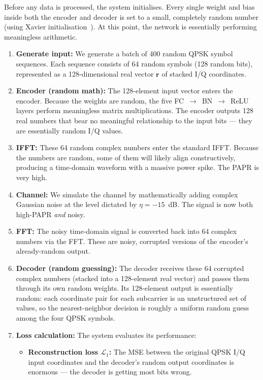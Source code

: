 Before any data is processed, the system initialises.  Every single weight and bias inside both the encoder and decoder is set to a small, completely random number (using Xavier initialisation~\cite{kim2017novel}).  At this point, the network is essentially performing meaningless arithmetic.

\begin{enumerate}
    \item \textbf{Generate input:} We generate a batch of 400 random QPSK symbol sequences. Each sequence consists of 64 random symbols (128 random bits), represented as a 128-dimensional real vector $\bm{r}$ of stacked I/Q coordinates.
    \item \textbf{Encoder (random math):} The 128-element input vector enters the encoder.  Because the weights are random, the five FC~$\to$~BN~$\to$~ReLU layers perform meaningless matrix multiplications.  The encoder outputs 128 real numbers that bear no meaningful relationship to the input bits --- they are essentially random I/Q values.
    \item \textbf{IFFT:} These 64 random complex numbers enter the standard IFFT. Because the numbers are random, some of them will likely align constructively, producing a time-domain waveform with a massive power spike.  The PAPR is very high.
    \item \textbf{Channel:} We simulate the channel by mathematically adding complex Gaussian noise at the level dictated by $\eta = -15$~dB. The signal is now both high-PAPR \emph{and} noisy.
    \item \textbf{FFT:} The noisy time-domain signal is converted back into 64 complex numbers via the FFT.  These are noisy, corrupted versions of the encoder's already-random output.
    \item \textbf{Decoder (random guessing):} The decoder receives these 64 corrupted complex numbers (stacked into a 128-element real vector) and passes them through its own random weights.  Its 128-element output is essentially random: each coordinate pair for each subcarrier is an unstructured set of values, so the nearest-neighbor decision is roughly a uniform random guess among the four QPSK symbols.
    \item \textbf{Loss calculation:} The system evaluates its performance:
          \begin{itemize}
              \item \textbf{Reconstruction loss $\mathcal{L}_1$:} The MSE between the original QPSK I/Q input coordinates and the decoder's random output coordinates is enormous --- the decoder is getting most bits wrong.

\end{itemize}
\end{enumerate}

